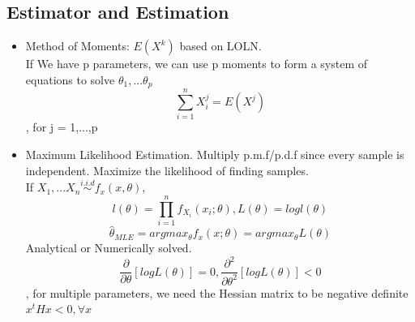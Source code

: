 \documentclass[11pt, openany]{book}              %
\begin{document}
\subsection{Estimator and Estimation}

\begin{itemize}
    \item Method of Moments: $E(X^k)$ based on LOLN.\\ 
    	If We have p parameters, we can use p moments to form a system of equations to solve $\theta_1,...\theta_p$
    	$$\sum_{i=1}^n X_i^j= E(X^j)$$, for j = 1,...,p
    \item Maximum Likelihood Estimation. Multiply p.m.f/p.d.f since every sample is independent. Maximize the likelihood of finding samples. \\ If $X_1,...X_n \stackrel{i.i.d}{\sim} f_x(x, \theta)$, 
    	$$ l(\theta) =  \prod_{i=1}^n f_{X_i} (x_i; \theta), L(\theta ) = log l(\theta)$$
    	$$ \hat{\theta}_{MLE}= argmax_{\theta} f_x(x;\theta ) = argmax_{\theta} L(\theta )$$
    	Analytical or Numerically solved. $$ \frac{\partial}{\partial \theta} [log L(\theta ) ] = 0, \frac{\partial^2}{\partial \theta^2} [log L(\theta ) ] < 0$$, for multiple parameters, we need the Hessian matrix to be negative definite $x^tHx<0, \forall x$ 
    	

\end{itemize}
\end{document}
